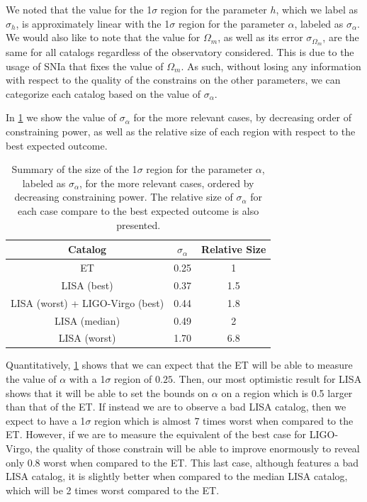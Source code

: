 We noted that the value for the 1$\sigma$ region for the parameter $h$, which we label as $\sigma_h$, is approximately linear with the 1$\sigma$ region for the parameter $\alpha$, labeled as $\sigma_\alpha$. We would also like to note that the value for $\Omega_m$, as well as its error $\sigma_{\Omega_m}$, are the same for all catalogs regardless of the observatory considered. This is due to the usage of \gls{SNIa} that fixes the value of $\Omega_m$. As such, without losing any information with respect to the quality of the constrains on the other parameters, we can categorize each catalog based on the value of $\sigma_\alpha$.

In \cref{tab:fQ-LCDM-bg-constrains} we show the value of $\sigma_\alpha$ for the more relevant cases, by decreasing order of constraining power, as well as the relative size of each region with respect to the best expected outcome.

\begin{table}[h!]
\centering
\begin{tabular}{|c|c|c|}
\hline
Catalog                          & $\sigma_\alpha$ & Relative Size \\ \hline
ET                               & 0.25            & 1             \\ \hline
LISA (best)                      & 0.37            & 1.5           \\ \hline
LISA (worst) + LIGO-Virgo (best) & 0.44            & 1.8           \\ \hline
LISA (median)                    & 0.49            & 2             \\ \hline
LISA (worst)                     & 1.70            & 6.8           \\ \hline
\end{tabular}
\caption{Summary of the size of the 1$\sigma$ region for the parameter $\alpha$, labeled as $\sigma_\alpha$, for the more relevant cases, ordered by decreasing constraining power. The relative size of $\sigma_\alpha$ for each case compare to the best expected outcome is also presented.}
\label{tab:fQ-LCDM-bg-constrains}
\end{table}

Quantitatively, \cref{tab:fQ-LCDM-bg-constrains} shows that we can expect that the \gls{ET} will be able to measure the value of $\alpha$ with a 1$\sigma$ region of $0.25$. Then, our most optimistic result for \gls{LISA} shows that it will be able to set the bounds on $\alpha$ on a region which is 0.5 larger than that of the \gls{ET}. If instead we are to observe a bad \gls{LISA} catalog, then we expect to have a 1$\sigma$ region which is almost 7 times worst when compared to the \gls{ET}. However, if we are to measure the equivalent of the best case for \gls{LIGO}-Virgo, the quality of those constrain will be able to improve enormously to reveal only 0.8 worst when compared to the \gls{ET}. This last case, although features a bad \gls{LISA} catalog, it is slightly better when compared to the median \gls{LISA} catalog, which will be 2 times worst compared to the \gls{ET}.


